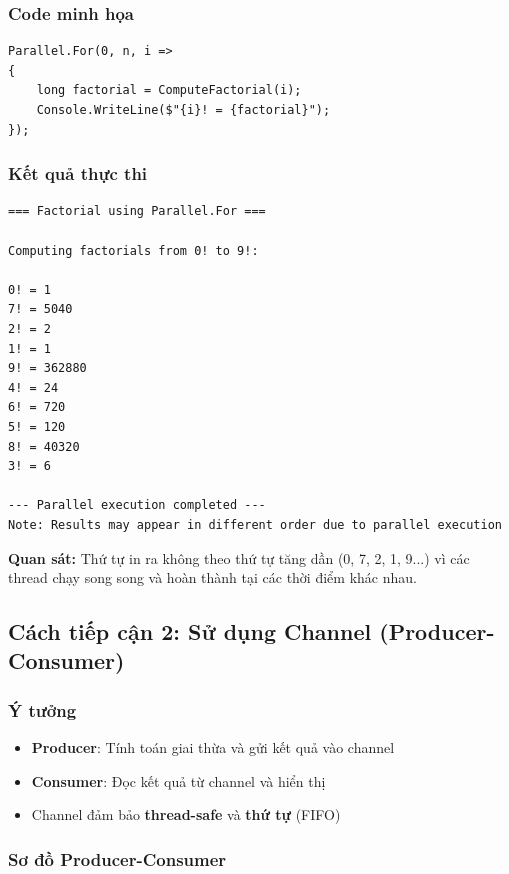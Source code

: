 \documentclass[12pt,a4paper]{article}
\begin{document}
\subsubsection{Code minh họa}

\begin{lstlisting}[language=CSharp, caption={Factorial với Parallel.For}]
Parallel.For(0, n, i =>
{
    long factorial = ComputeFactorial(i);
    Console.WriteLine($"{i}! = {factorial}");
});
\end{lstlisting}

\subsubsection{Kết quả thực thi}

\begin{Verbatim}[frame=single, fontsize=\small]
=== Factorial using Parallel.For ===

Computing factorials from 0! to 9!:

0! = 1
7! = 5040
2! = 2
1! = 1
9! = 362880
4! = 24
6! = 720
5! = 120
8! = 40320
3! = 6

--- Parallel execution completed ---
Note: Results may appear in different order due to parallel execution
\end{Verbatim}

\textbf{Quan sát:} Thứ tự in ra không theo thứ tự tăng dần (0, 7, 2, 1, 9...) vì các thread chạy song song và hoàn thành tại các thời điểm khác nhau.

\subsection{Cách tiếp cận 2: Sử dụng Channel (Producer-Consumer)}

\subsubsection{Ý tưởng}

\begin{itemize}
    \item \textbf{Producer}: Tính toán giai thừa và gửi kết quả vào channel
    \item \textbf{Consumer}: Đọc kết quả từ channel và hiển thị
    \item Channel đảm bảo \textbf{thread-safe} và \textbf{thứ tự} (FIFO)
\end{itemize}

\subsubsection{Sơ đồ Producer-Consumer}
\end{document}
